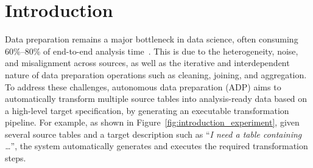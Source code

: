 \section{Introduction}
\label{sec:intro}




Data preparation remains a major bottleneck in data science, often consuming 60\%--80\% of end-to-end analysis time~\cite{dasu2003exploratory}. 
This is due to the heterogeneity, noise, and misalignment across sources, as well as the iterative and interdependent nature of data preparation operations such as cleaning, joining, and aggregation.
To address these challenges, autonomous data preparation (ADP) aims to automatically transform multiple source tables into analysis-ready data based on a high-level target specification, by generating an executable transformation pipeline. For example, as shown in Figure~\ref{fig:introduction_experiment}, given several source tables and a target description such as ``\emph{I need a table containing \ldots}'', the system automatically generates and executes the required transformation steps.

%

